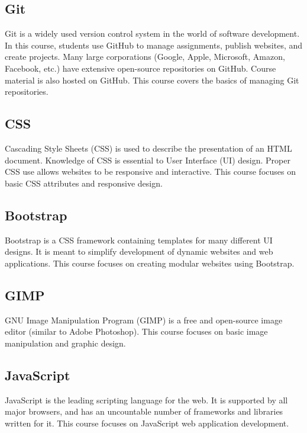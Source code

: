 \documentclass{article}
\begin{document}
	\subsection{Git}
	
	Git is a widely used version control system in the world of software development. In this course, students use GitHub to manage assignments, publish websites, and create projects. Many large corporations (Google, Apple, Microsoft, Amazon, Facebook, etc.) have extensive open-source repositories on GitHub. Course material is also hosted on GitHub. This course covers the basics of managing Git repositories.
	
	\subsection{CSS}
	
	Cascading Style Sheets (CSS) is used to describe the presentation of an HTML document. Knowledge of CSS is essential to User Interface (UI) design. Proper CSS use allows websites to be responsive and interactive. This course focuses on basic CSS attributes and responsive design.
	
	\subsection{Bootstrap}
	
	Bootstrap is a CSS framework containing templates for many different UI designs. It is meant to simplify development of dynamic websites and web applications. This course focuses on creating modular websites using Bootstrap. 
	
	\subsection{GIMP}
	
	GNU Image Manipulation Program (GIMP) is a free and open-source image editor (similar to Adobe Photoshop). This course focuses on basic image manipulation and graphic design.

	\subsection{JavaScript}
	
	JavaScript is the leading scripting language for the web. It is supported by all major browsers, and has an uncountable number of frameworks and libraries written for it. This course focuses on JavaScript web application development.
		
\end{document}
